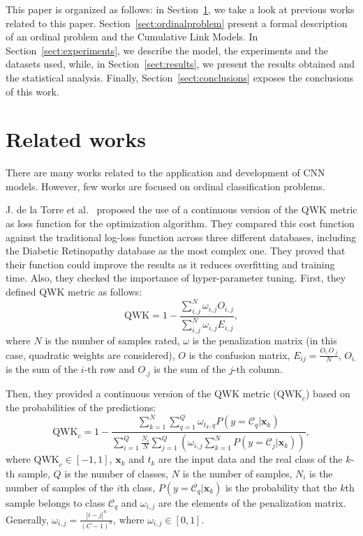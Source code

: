 \documentclass[journal]{IEEEtran}
\begin{document}
	This paper is organized as follows: in Section~\ref{sect:relatedwork}, we take a look at previous works related to this paper. Section~\ref{sect:ordinalproblem} present a formal description of an ordinal problem and the Cumulative Link Models. In Section~\ref{sect:experiments}, we describe the model, the experiments and the datasets used, while, in Section~\ref{sect:results}, we present the results obtained and the statistical analysis. Finally, Section~\ref{sect:conclusions} exposes the conclusions of this work.
	
	\section{Related works}
	\label{sect:relatedwork}
	There are many works related to the application and development of CNN models. However, few works are focused on ordinal classification problems.
	
	J. de la Torre et al.~\cite{de2018weighted} proposed the use of a continuous version of the QWK metric as loss function for the optimization algorithm. They compared this cost function against the traditional log-loss function across three different databases, including the Diabetic Retinopathy database as the most complex one. They proved that their function could improve the results as it reduces overfitting and training time. Also, they checked the importance of hyper-parameter tuning. First, they defined QWK metric as follows:
	\begin{equation}
	\text{QWK} = 1 - \frac{\sum\limits^N_{i,j} \omega_{i,j} O_{i,j}}{\sum\limits^N_{i,j} \omega_{i,j} E_{i,j}},
	\end{equation}
	where $N$ is the number of samples rated, $\omega$ is the penalization matrix (in this case, quadratic weights are considered), $O$ is the confusion matrix, $E_{ij} = \frac{O_{i.} O_{.j}}{N}$, $O_{i.}$ is the sum of the $i\text{-th}$ row and $O_{.j}$ is the sum of the $j\text{-th}$ column.
	
	Then, they provided a continuous version of the QWK metric ($\text{QWK}_c$) based on the probabilities of the predictions:
	\begin{equation}
	\text{QWK}_c = 1 - \frac{\sum\limits_{k=1}^N \sum\limits_{q=1}^Q \omega_{t_k, q} P(y = \mathcal{C}_q | \mathbf{x}_k)}{\sum\limits_{i=1}^Q \frac{N_i}{N} \sum\limits_{j=1}^Q ( \omega_{i,j} \sum\limits_{k=1}^N P(y = \mathcal{C}_j | \mathbf{x}_k))},
	\end{equation}
	where $\text{QWK}_c \in [-1,1]$, $\mathbf{x}_k$ and $t_k$ are the input data and the real class of the $k$-th sample, $Q$ is the number of classes, $N$ is the number of samples, $N_i$ is the number of samples of the $i$th class, $P(y = \mathcal{C}_q | \mathbf{x}_k)$ is the probability that the $k$th sample belongs to class $\mathcal{C}_q$ and $\omega_{i,j}$ are the elements of the penalization matrix. Generally, $\omega_{i,j} = \frac{|i-j|^n}{(C-1)^n}$, where $\omega_{i,j} \in [0,1]$.
	
\end{document}
